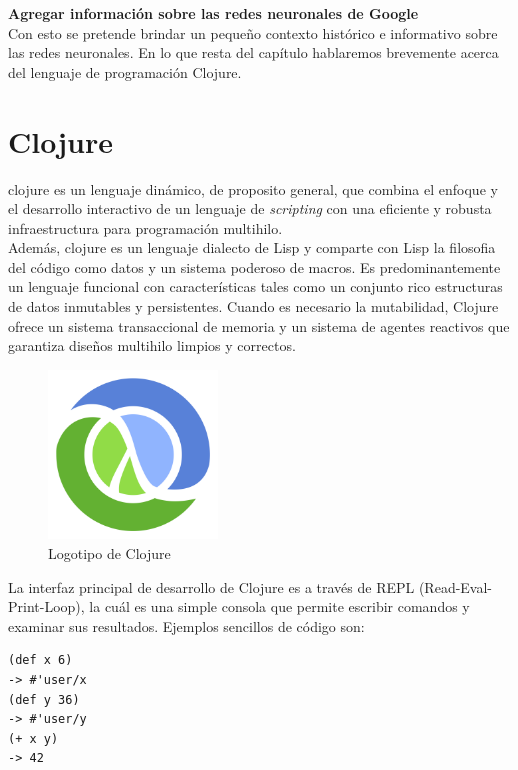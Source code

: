 \textbf{Agregar información sobre las redes neuronales de Google}\\

Con esto se pretende brindar un pequeño contexto histórico e
informativo sobre las redes neuronales. En lo que resta del capítulo
hablaremos brevemente acerca del lenguaje de programación Clojure.

\section{Clojure}

\gls{clojure} es un lenguaje dinámico, de proposito general, que combina el
enfoque y el desarrollo interactivo de un lenguaje de
\textsl{scripting} con una eficiente y robusta infraestructura para
programación multihilo.\\

Además, \gls{clojure} es un lenguaje dialecto de Lisp y comparte con
Lisp la filosofia del código como datos y un sistema poderoso de
macros. Es predominantemente un lenguaje funcional con características
tales como un conjunto rico estructuras de datos inmutables y
persistentes. Cuando es necesario la mutabilidad, Clojure ofrece un
sistema transaccional de memoria y un sistema de agentes reactivos que
garantiza diseños multihilo limpios y correctos.\\

\begin{figure}[h!]
  \centering
  \includegraphics[width=0.40\textwidth]{Clojure}
  \caption{Logotipo de Clojure}
  \label{fig:clojure}
\end{figure}

La interfaz principal de desarrollo de Clojure es a través de REPL
(Read-Eval-Print-Loop), la cuál es una simple consola que permite
escribir comandos y examinar sus resultados. Ejemplos sencillos de
código son:

\begin{verbatim}
(def x 6)
-> #'user/x
(def y 36)
-> #'user/y
(+ x y)
-> 42
\end{verbatim}

